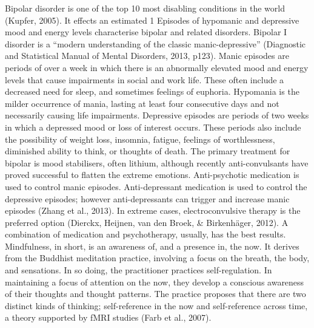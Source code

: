 Bipolar disorder is one of the top 10 most disabling conditions in the world (Kupfer, 2005). It effects an estimated 1%
Episodes of hypomanic and depressive mood and energy levels characterise bipolar and related disorders. Bipolar I disorder is a “modern understanding of the classic manic-depressive” (Diagnostic and Statistical Manual of Mental Disorders, 2013, p123). Manic episodes are periods of over a week in which there is an abnormally elevated mood and energy levels that cause impairments in social and work life. These often include a decreased need for sleep, and sometimes feelings of euphoria. Hypomania is the milder occurrence of mania, lasting at least four consecutive days and not necessarily causing life impairments. Depressive episodes are periods of two weeks in which a depressed mood or loss of interest occurs. These periods also include the possibility of weight loss, insomnia, fatigue, feelings of worthlessness, diminished ability to think, or thoughts of death.
The primary treatment for bipolar is mood stabilisers, often lithium, although recently anti-convulsants have proved successful to flatten the extreme emotions. Anti-psychotic medication is used to control manic episodes. Anti-depressant medication is used to control the depressive episodes; however anti-depressants can trigger and increase manic episodes (Zhang et al., 2013). In extreme cases, electroconvulsive therapy is the preferred option (Dierckx, Heijnen, van den Broek, & Birkenhäger, 2012). A combination of medication and psychotherapy, usually, has the best results. 
Mindfulness, in short, is an awareness of, and a presence in, the now. It derives from the Buddhist meditation practice, involving a focus on the breath, the body, and sensations. In so doing, the practitioner practices self-regulation. In maintaining a focus of attention on the now, they develop a conscious awareness of their thoughts and thought patterns. The practice proposes that there are two distinct kinds of thinking; self-reference in the now and self-reference across time, a theory supported by fMRI studies (Farb et al., 2007). 

